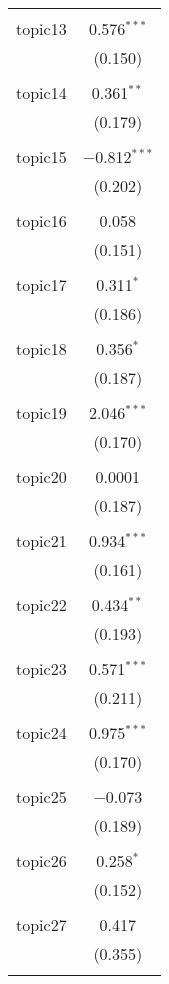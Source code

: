 \begin{table}[!htbp]
\begin{adjustbox}{totalheight=\baselineskip}
\begin{tabular}{@{\extracolsep{5pt}}lc}
  & \\ 
 topic13 & 0.576$^{***}$ \\ 
  & (0.150) \\ 
  & \\ 
 topic14 & 0.361$^{**}$ \\ 
  & (0.179) \\ 
  & \\ 
 topic15 & $-$0.812$^{***}$ \\ 
  & (0.202) \\ 
  & \\ 
 topic16 & 0.058 \\ 
  & (0.151) \\ 
  & \\ 
 topic17 & 0.311$^{*}$ \\ 
  & (0.186) \\ 
  & \\ 
 topic18 & 0.356$^{*}$ \\ 
  & (0.187) \\ 
  & \\ 
 topic19 & 2.046$^{***}$ \\ 
  & (0.170) \\ 
  & \\ 
 topic20 & 0.0001 \\ 
  & (0.187) \\ 
  & \\ 
 topic21 & 0.934$^{***}$ \\ 
  & (0.161) \\ 
  & \\ 
 topic22 & 0.434$^{**}$ \\ 
  & (0.193) \\ 
  & \\ 
 topic23 & 0.571$^{***}$ \\ 
  & (0.211) \\ 
  & \\ 
 topic24 & 0.975$^{***}$ \\ 
  & (0.170) \\ 
  & \\ 
 topic25 & $-$0.073 \\ 
  & (0.189) \\ 
  & \\ 
 topic26 & 0.258$^{*}$ \\ 
  & (0.152) \\ 
  & \\ 
 topic27 & 0.417 \\ 
  & (0.355) \\ 
  & \\ 

\end{tabular}
\end{adjustbox}
\end{table}
